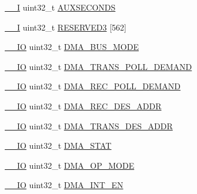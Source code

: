 \begin{DoxyCompactItemize}
\item 
\hyperlink{core__sc300_8h_af63697ed9952cc71e1225efe205f6cd3}{\+\_\+\+\_\+I} uint32\+\_\+t \hyperlink{struct_l_p_c___e_n_e_t___t_ad3998715b672d2823dd6a0fb84635b42}{A\+U\+X\+S\+E\+C\+O\+N\+DS}
\item 
\hyperlink{core__sc300_8h_af63697ed9952cc71e1225efe205f6cd3}{\+\_\+\+\_\+I} uint32\+\_\+t \hyperlink{struct_l_p_c___e_n_e_t___t_a761b4b557a3ec7958b443307b85d05da}{R\+E\+S\+E\+R\+V\+E\+D3} \mbox{[}562\mbox{]}
\item 
\hyperlink{core__sc300_8h_aec43007d9998a0a0e01faede4133d6be}{\+\_\+\+\_\+\+IO} uint32\+\_\+t \hyperlink{struct_l_p_c___e_n_e_t___t_aa0a26a98845c1551d2c6a7ee3444ae8e}{D\+M\+A\+\_\+\+B\+U\+S\+\_\+\+M\+O\+DE}
\item 
\hyperlink{core__sc300_8h_aec43007d9998a0a0e01faede4133d6be}{\+\_\+\+\_\+\+IO} uint32\+\_\+t \hyperlink{struct_l_p_c___e_n_e_t___t_a9194d4a06be3748ac15c7e3933c32e3e}{D\+M\+A\+\_\+\+T\+R\+A\+N\+S\+\_\+\+P\+O\+L\+L\+\_\+\+D\+E\+M\+A\+ND}
\item 
\hyperlink{core__sc300_8h_aec43007d9998a0a0e01faede4133d6be}{\+\_\+\+\_\+\+IO} uint32\+\_\+t \hyperlink{struct_l_p_c___e_n_e_t___t_ab70a361b281e249ebc59b19e89b1177b}{D\+M\+A\+\_\+\+R\+E\+C\+\_\+\+P\+O\+L\+L\+\_\+\+D\+E\+M\+A\+ND}
\item 
\hyperlink{core__sc300_8h_aec43007d9998a0a0e01faede4133d6be}{\+\_\+\+\_\+\+IO} uint32\+\_\+t \hyperlink{struct_l_p_c___e_n_e_t___t_af36559ce74d25a2ad863ae386a1c57b6}{D\+M\+A\+\_\+\+R\+E\+C\+\_\+\+D\+E\+S\+\_\+\+A\+D\+DR}
\item 
\hyperlink{core__sc300_8h_aec43007d9998a0a0e01faede4133d6be}{\+\_\+\+\_\+\+IO} uint32\+\_\+t \hyperlink{struct_l_p_c___e_n_e_t___t_acb42e7fa2c3d9814b77c7d9a65a516a5}{D\+M\+A\+\_\+\+T\+R\+A\+N\+S\+\_\+\+D\+E\+S\+\_\+\+A\+D\+DR}
\item 
\hyperlink{core__sc300_8h_aec43007d9998a0a0e01faede4133d6be}{\+\_\+\+\_\+\+IO} uint32\+\_\+t \hyperlink{struct_l_p_c___e_n_e_t___t_a96f961a042a51b7fbea1f22e9f1bf986}{D\+M\+A\+\_\+\+S\+T\+AT}
\item 
\hyperlink{core__sc300_8h_aec43007d9998a0a0e01faede4133d6be}{\+\_\+\+\_\+\+IO} uint32\+\_\+t \hyperlink{struct_l_p_c___e_n_e_t___t_ae60618c49c07b0e0ff1f715bc4cd6e86}{D\+M\+A\+\_\+\+O\+P\+\_\+\+M\+O\+DE}
\item 
\hyperlink{core__sc300_8h_aec43007d9998a0a0e01faede4133d6be}{\+\_\+\+\_\+\+IO} uint32\+\_\+t \hyperlink{struct_l_p_c___e_n_e_t___t_a28959be8f681255a1daa24307ec79f4c}{D\+M\+A\+\_\+\+I\+N\+T\+\_\+\+EN}
\item 

\end{DoxyCompactItemize}

